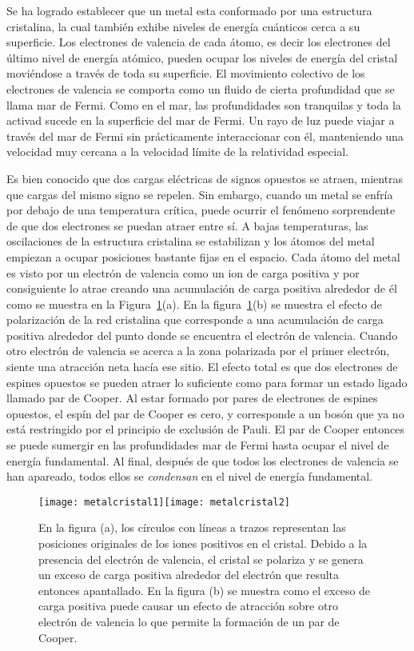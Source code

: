 Se ha logrado establecer que un metal esta conformado por una estructura cristalina, la cual también exhibe niveles de energía cuánticos cerca a su superficie. Los electrones de valencia  de cada átomo, es decir los electrones del último nivel de energía atómico, pueden ocupar los niveles de energía del cristal moviéndose a través de toda su superficie. El movimiento colectivo de los electrones de valencia se comporta como un fluido de cierta profundidad que se llama mar de Fermi. Como en el mar, las profundidades son tranquilas y toda la activad sucede en la superficie del mar de Fermi. Un rayo de luz puede viajar a través del mar de Fermi sin prácticamente interaccionar con él, manteniendo una velocidad muy cercana a la velocidad límite de la relatividad especial.

Es bien conocido que dos cargas eléctricas de signos opuestos se atraen, mientras que cargas del mismo signo se repelen. Sin embargo, cuando un metal se enfría por debajo de una temperatura crítica, puede ocurrir el fenómeno sorprendente de que dos electrones se puedan atraer entre sí. A bajas temperaturas, las oscilaciones de la estructura cristalina se estabilizan y los átomos del metal empiezan a ocupar posiciones bastante fijas en el espacio. Cada átomo del metal es visto por un electrón de valencia como un ion de carga positiva y por consiguiente lo atrae creando una acumulación de carga positiva alrededor de él como se muestra en la Figura~\ref{fig:1}(a).  En la figura~\ref{fig:1}(b) se muestra  el efecto de polarización de la red cristalina que corresponde a una acumulación de carga positiva alrededor del punto donde se encuentra el electrón de valencia. Cuando otro electrón de valencia se acerca a la zona polarizada por el primer electrón,  siente una atracción neta hacía ese sitio. El efecto total es que dos electrones de espines opuestos se pueden atraer lo suficiente como para formar un estado ligado llamado par de Cooper. Al estar formado por pares de electrones de espines opuestos, el espín del par de Cooper es cero, y corresponde a un  bosón que ya no está restringido por el principio de exclusión de Pauli. El par de Cooper entonces se puede sumergir en las profundidades mar de Fermi hasta ocupar el nivel de energía fundamental. Al final, después de que todos los electrones de valencia se han apareado, todos ellos se \emph{condensan} en el nivel de energía fundamental.

\begin{figure}
  \centering
  \texttt{[image: metalcristal1]}\hspace{4cm}\texttt{[image: metalcristal2]}
  \caption{En la figura (a), los círculos con líneas a trazos representan las posiciones originales de los iones positivos en el cristal. Debido a la presencia del electrón de valencia, el cristal se polariza y se genera un exceso de carga positiva alrededor del electrón que resulta entonces apantallado. En la figura (b) se muestra como el exceso de carga positiva puede causar un efecto de atracción sobre otro electrón de valencia lo que permite la formación de un par de Cooper.}
  \label{fig:1}
\end{figure}

